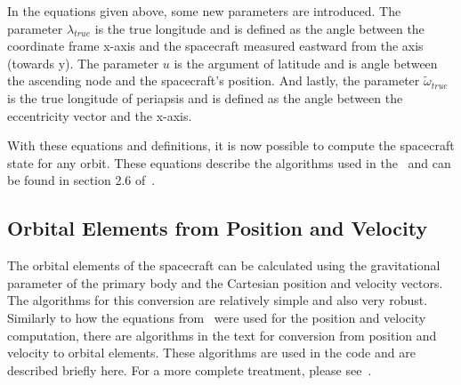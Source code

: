 In the equations given above, some new parameters are introduced.  The
parameter $\lambda_{true}$ is the true longitude and is defined as the angle
between the coordinate frame x-axis and the spacecraft measured eastward from
the axis (towards y).  The parameter $u$ is the argument of latitude and is
angle between the ascending node and the spacecraft's position.  And lastly,
the parameter $\tilde{\omega}_{true}$ is the true longitude of periapsis and
is defined as the angle between the eccentricity vector and the x-axis.

With these equations and definitions, it is now possible to compute the
spacecraft state for any orbit.  These equations describe the algorithms used
in the \OrbitalElement\ and can be found in section 2.6 of~\cite{Vallado}.

\subsection{Orbital Elements from Position and Velocity}
The orbital elements of the spacecraft can be calculated using the
gravitational parameter of the primary body and the Cartesian position and
velocity vectors.  The algorithms for this conversion are relatively simple
and also very robust.  Similarly to how the equations from~\cite{Vallado} were
used for the position and velocity computation, there are algorithms in the
text for conversion from position and velocity to orbital elements.  These
algorithms are used in the code and are described briefly here.  For a more
complete treatment, please see~\cite{Vallado}.

